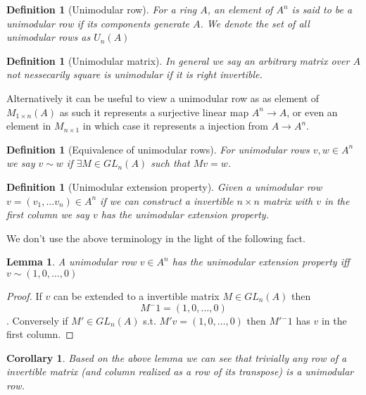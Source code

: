 \documentclass[12pt]{article}
\numberwithin{equation}{section}
\newcounter{dummy} \numberwithin{dummy}{section}
\newtheorem{definition}[dummy]{Definition}
\newtheorem{corollary}[dummy]{Corollary}
\newtheorem{lemma}[dummy]{Lemma}
\begin{document}
	
	\begin{definition}[Unimodular row]
		For a ring $A$, an element of $A^n$ is said to be a unimodular row if its components generate	$A$. We denote the set of all unimodular rows as $U_n(A)$
	\end{definition}
	\begin{definition}[Unimodular matrix]
		In general we say an arbitrary matrix over $A$ not nessecarily square is unimodular if it is right invertible.
	\end{definition}
	Alternatively it can be useful to view a unimodular row as as element of $M_{1 \times n} (A) $ as such it represents a surjective linear map $A^n \to A$, or even an element in $M_{n \times 1}$ in which case it represents a injection from $A \to A^n$.
	
	\begin{definition}[Equivalence of unimodular rows]
		For unimodular rows $v,w\in A^n$ we say $v \sim w $ if $\exists M \in GL_n(A)$ such that $Mv=w$.
	\end{definition}
	
	\begin{definition}[Unimodular extension property]
		Given a unimodular row $v=(v_1,\dots v_n) \in A^n$ if we can construct a invertible $n \times n $  matrix with $v$ in the first column we say $v$ has the unimodular extension property.
	\end{definition}
	

	
	We don't use the above terminology in the light of the following fact.
	
	\begin{lemma}
		A unimodular row $v \in A^n$ has the unimodular extension property iff $v \sim (1,0,\dots ,0)$
	\end{lemma}
	\begin{proof}
		If $v$ can be extended to a invertible matrix $M \in GL_n(A)$ then \[ M{^-1} = (1,0,\dots, 0) \].
		Conversely if $M' \in GL_n(A) $ s.t. $M'v=(1,0,\dots,0)$ then $M'{^-1}$ has $v$ in the first column.
	\end{proof}
		\begin{corollary}\label{row-of-inv-mat-unimod}
		Based on the above lemma we can see that trivially any row of a invertible matrix (and column realized as a row of its transpose) is a unimodular row. 
	\end{corollary}
	
\end{document}
